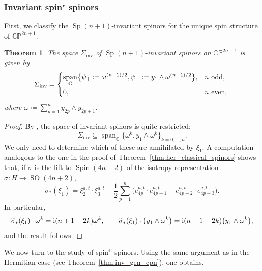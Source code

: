 \documentclass[pdftex]{sigma}
\numberwithin{equation}{section}
\newtheorem{Theorem}{Theorem}[section]
\DeclareMathOperator{\vecspan}{span}
\DeclareMathOperator{\SO}{SO}
\DeclareMathOperator{\Spin}{Spin}
\DeclareMathOperator{\Sp}{Sp}
\begin{document}
		\subsubsection[Invariant spin\^{}r spinors]{Invariant spin$^{\boldsymbol{r}}$ spinors}
		
		First, we classify the $\Sp(n+1)$-invariant spinors for the unique spin structure of $\mathbb{CP}^{2n+1}$.
		\begin{Theorem}\label{thm:symp_cpn_spinors}
			The space $\Sigma_{\mathrm{inv}}$ of $\Sp(n+1)$-invariant spinors on $\mathbb{CP}^{2n+1}$ is given by
			\begin{equation*}
				\Sigma_{\text{inv}} =
				\begin{dcases}
					\vecspan_{\mathbb{C}} \bigl\{\psi_{+} \coloneqq \omega^{(n+1)/2} , \psi_{-} \coloneqq y_1 \wedge \omega^{(n-1)/2} \bigr\}, & n \text{ odd, }\\
					0 ,& n \text{ even, }
				\end{dcases}
			\end{equation*}
			where $\omega \coloneqq \sum_{p=1}^{n} y_{2p} \wedge y_{2p+1}$.
		\end{Theorem}
		\begin{proof}
			By \cite[Theorem~4.11]{AHL}, the space of invariant spinors is quite restricted:
			\[
			\Sigma_{\mathrm{inv}} \subseteq \vecspan_{\mathbb{C}}\bigl\{ \omega^k , y_1 \wedge \omega^k \bigr\}_{k=0, \dots , n } .
			\]
			We only need to determine which of these are annihilated by $\xi_1$. A computation analogous to the one in the proof of Theorem~\ref{thm:her_classical_spinors} shows that, if $\widetilde{\sigma}$ is the lift to $\Spin(4n+2)$ of the isotropy representation $\sigma \colon H \to \SO(4n+2)$,
			\[ \widetilde{\sigma}_*(\xi_1) = \xi^{a,t}_2 \cdot \xi^{a,t}_3 + \frac{1}{2} \sum_{p=1}^{n} \bigl( e^{a,t}_{4p} \cdot e^{a,t}_{4p+1} + e^{a,t}_{4p+2} \cdot e^{a,t}_{4p+3} \bigr) . \]
			In particular,
			\[ \widetilde{\sigma}_*(\xi_1) \cdot \omega^k = {\rm i} (n+1-2k) \omega^k , \qquad \widetilde{\sigma}_* (\xi_1) \cdot \bigl( y_1 \wedge \omega^k \bigr) = {\rm i} (n-1-2k)\bigl( y_1 \wedge \omega^k \bigr) , \]
			and the result follows.
		\end{proof}

		We now turn to the study of spin$^{\mathbb{C}}$ spinors. Using the same argument as in the Hermitian case (see Theorem~\ref{thm:inv_gen_cpn}), one obtains.
\end{document}
